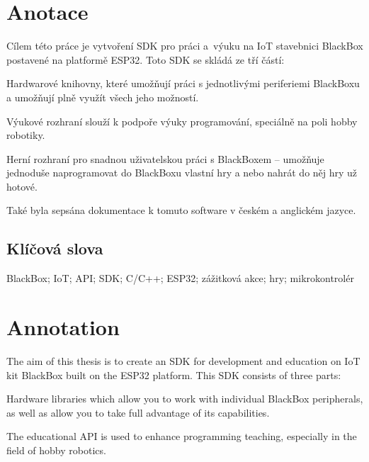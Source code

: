 \documentclass{template/socthesis}
\author{Tomáš Rohlínek}
\begin{document}
\maketitle




\pagestyle{empty}
\enlargethispage{20mm}

\section*{Anotace}
Cílem této práce je vytvoření SDK pro práci a~výuku na IoT stavebnici BlackBox postavené na platformě ESP32. Toto SDK se skládá ze tří částí: 

Hardwarové knihovny, které umožňují práci s jednotlivými periferiemi BlackBoxu 
a umožňují plně využít všech jeho možností. 

Výukové rozhraní slouží k podpoře výuky programování, speciálně na poli hobby robotiky. 
 
Herní rozhraní pro snadnou uživatelskou práci s BlackBoxem -- umožňuje jednoduše naprogramovat do BlackBoxu vlastní hry a nebo nahrát do něj hry už hotové. 

Také byla sepsána dokumentace k tomuto software v českém a anglickém jazyce. 



\subsection*{Klíčová slova}
BlackBox; IoT; API; SDK; C/C++; ESP32; zážitková akce; hry; mikrokontrolér


\section*{Annotation}
The aim of this thesis is to create an SDK for development and education on IoT kit BlackBox built on the ESP32 platform. This SDK consists of three parts:

Hardware libraries which allow you to work with individual BlackBox peripherals,
as well as allow you to take full advantage of its capabilities.

The educational API is used to enhance programming teaching, especially in the field of hobby robotics.
 
\end{document}
